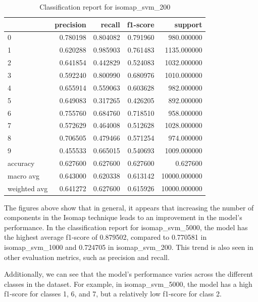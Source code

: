        \begin{table}[htb!]
            \centering
            \caption{Classification report for isomap_svm_200}
            \label{tab:classification-report-isomap_svm_200}
            \begin{tabular}{lrrrr}
            \toprule
            & precision & recall & f1-score & support \\
            \midrule
            0 & 0.780198 & 0.804082 & 0.791960 & 980.000000 \\
            1 & 0.620288 & 0.985903 & 0.761483 & 1135.000000 \\
            2 & 0.641854 & 0.442829 & 0.524083 & 1032.000000 \\
            3 & 0.592240 & 0.800990 & 0.680976 & 1010.000000 \\
            4 & 0.655914 & 0.559063 & 0.603628 & 982.000000 \\
            5 & 0.649083 & 0.317265 & 0.426205 & 892.000000 \\
            6 & 0.755760 & 0.684760 & 0.718510 & 958.000000 \\
            7 & 0.572629 & 0.464008 & 0.512628 & 1028.000000 \\
            8 & 0.706505 & 0.479466 & 0.571254 & 974.000000 \\
            9 & 0.455533 & 0.665015 & 0.540693 & 1009.000000 \\
            accuracy & 0.627600 & 0.627600 & 0.627600 & 0.627600 \\
            macro avg & 0.643000 & 0.620338 & 0.613142 & 10000.000000 \\
            weighted avg & 0.641272 & 0.627600 & 0.615926 & 10000.000000 \\
            \bottomrule
            \end{tabular}
            \end{table}

The figures above show that in general, it appears that increasing the number of components in the Isomap technique leads to an improvement in the model's performance. In the classification report for isomap_svm_5000, the model has the highest average f1-score of 0.879502, compared to 0.770581 in isomap_svm_1000 and 0.724705 in isomap_svm_200. This trend is also seen in other evaluation metrics, such as precision and recall.

Additionally, we can see that the model's performance varies across the different classes in the dataset. For example, in isomap_svm_5000, the model has a high f1-score for classes 1, 6, and 7, but a relatively low f1-score for class 2.


